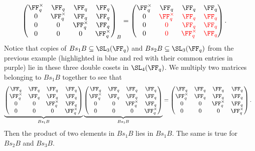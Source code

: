 \documentclass[11pt]{amsart}
\theoremstyle{remark}
\begin{document}
\begin{align*}
{\begin{pmatrix}
			\FF_q^\times & \FF_q        & \FF_q        & \FF_q        \\
			0            & \FF_q^\times & \FF_q        & \FF_q        \\
			0            & 0            & \FF_q^\times & \FF_q        \\
			0            & 0            & 0            & \FF_q^\times \\
		\end{pmatrix}}_{B} & =
	\begin{pmatrix}
		\FF_q^\times & \FF_q                   & \FF_q                   & \FF_q            \\
		0            & \color{red}\FF_q^\times & \color{red}\FF_q        & \color{red}\FF_q \\
		0            & \color{red}0            & \color{red}\FF_q        & \color{red}\FF_q \\
		0            & \color{red}0            & \color{red}\FF_q^\times & \color{red}\FF_q
	\end{pmatrix}.
\end{align*}
Notice that copies of $Bs_1B\subseteq\SL_3(\FF_q)$ and $Bs_2B\subseteq\SL_3(\FF_q)$ from the previous example (highlighted in {\color{blue}blue} and {\color{red}red} with their common entries in {\color{violet}purple}) lie in these three double cosets in $\SL_4(\FF_q)$.
We multiply two matrices belonging to $Bs_1B$ together to see that
\[
	\underbrace{\begin{pmatrix}
			\FF_q        & \FF_q & \FF_q        & \FF_q        \\
			\FF_q^\times & \FF_q & \FF_q        & \FF_q        \\
			0            & 0     & \FF_q^\times & \FF_q        \\
			0            & 0     & 0            & \FF_q^\times
		\end{pmatrix}}_{Bs_1B}
	\underbrace{\begin{pmatrix}
			\FF_q        & \FF_q & \FF_q        & \FF_q        \\
			\FF_q^\times & \FF_q & \FF_q        & \FF_q        \\
			0            & 0     & \FF_q^\times & \FF_q        \\
			0            & 0     & 0            & \FF_q^\times
		\end{pmatrix}}_{Bs_1B} =
	\begin{pmatrix}
		\FF_q        & \FF_q & \FF_q        & \FF_q        \\
		\FF_q^\times & \FF_q & \FF_q        & \FF_q        \\
		0            & 0     & \FF_q^\times & \FF_q        \\
		0            & 0     & 0            & \FF_q^\times
	\end{pmatrix}.
\]
Then the product of two elements in $Bs_1B$ lies in $Bs_1B$.
The same is true for $Bs_2B$ and $Bs_3B$.
\end{document}
